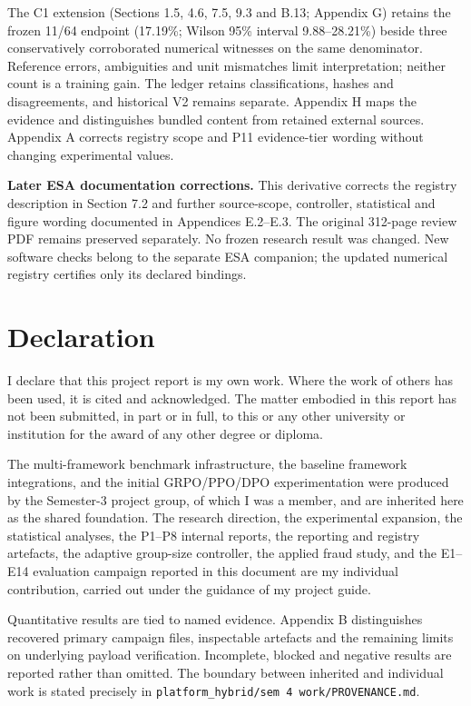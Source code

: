 The C1 extension (Sections 1.5, 4.6, 7.5, 9.3 and B.13; Appendix G) retains the frozen 11/64 endpoint (17.19\%; Wilson 95\% interval 9.88--28.21\%) beside three conservatively corroborated numerical witnesses on the same denominator. Reference errors, ambiguities and unit mismatches limit interpretation; neither count is a training gain. The ledger retains classifications, hashes and disagreements, and historical V2 remains separate. Appendix H maps the evidence and distinguishes bundled content from retained external sources. Appendix A corrects registry scope and P11 evidence-tier wording without changing experimental values.

\noindent\textbf{Later ESA documentation corrections.} This derivative corrects the registry description in Section 7.2 and further source-scope, controller, statistical and figure wording documented in Appendices E.2--E.3. The original 312-page review PDF remains preserved separately. No frozen research result was changed. New software checks belong to the separate ESA companion; the updated numerical registry certifies only its declared bindings.

\chapter*{Declaration}
\thispagestyle{plain}

I declare that this project report is my own work. Where the work of others has
been used, it is cited and acknowledged. The matter embodied in this report has
not been submitted, in part or in full, to this or any other university or
institution for the award of any other degree or diploma.

The multi-framework benchmark infrastructure, the baseline framework
integrations, and the initial GRPO/PPO/DPO experimentation were produced by the
Semester-3 project group, of which I was a member, and are inherited here as
the shared foundation. The research direction, the experimental expansion, the
statistical analyses, the P1--P8 internal reports, the reporting and registry
artefacts, the adaptive group-size controller, the applied fraud study, and the
E1--E14 evaluation campaign reported in this document are my
individual contribution, carried out under the guidance of my project guide.

Quantitative results are tied to named evidence. Appendix B distinguishes
recovered primary campaign files, inspectable artefacts and the remaining
limits on underlying payload verification. Incomplete, blocked and negative
results are reported rather than omitted. The boundary between inherited and
individual work is stated precisely in \texttt{platform\_hybrid/sem 4
work/PROVENANCE.md}.

